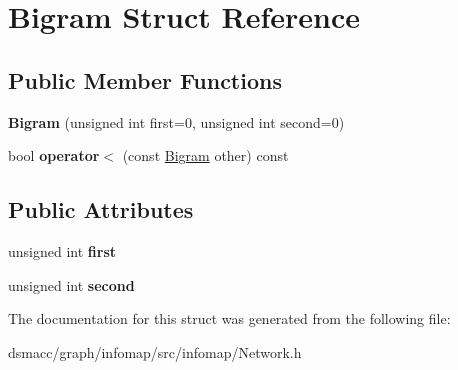 \hypertarget{structBigram}{}\section{Bigram Struct Reference}
\label{structBigram}
\subsection*{Public Member Functions}
\begin{DoxyCompactItemize}
\item 
\mbox{\label{structBigram_ac2e4f5f097e5ce3f4ae9392c8488f523}} 
{\bfseries Bigram} (unsigned int first=0, unsigned int second=0)
\item 
\mbox{\label{structBigram_a25194f0b19dc39c7b9a59936876c5453}} 
bool {\bfseries operator$<$} (const \mbox{\hyperlink{structBigram}{Bigram}} other) const
\end{DoxyCompactItemize}
\subsection*{Public Attributes}
\begin{DoxyCompactItemize}
\item 
\mbox{\label{structBigram_a38d5b929e96c9e6dab48f175d8c52655}} 
unsigned int {\bfseries first}
\item 
\mbox{\label{structBigram_a89a942aa94857ebf3a8324bc92b08cdd}} 
unsigned int {\bfseries second}
\end{DoxyCompactItemize}


The documentation for this struct was generated from the following file\+:\begin{DoxyCompactItemize}
\item 
dsmacc/graph/infomap/src/infomap/Network.\+h\end{DoxyCompactItemize}

